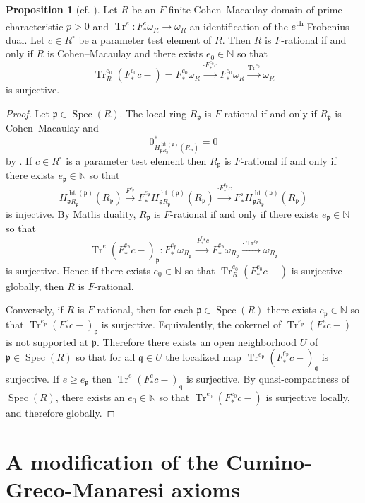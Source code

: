 \documentclass[reqno,11pt]{amsart}
\numberwithin{equation}{section}
\theoremstyle{definition}
\theoremstyle{definition}
\newtheorem{proposition}[theorem]{Proposition}
\theoremstyle{definition}
\theoremstyle{remark}
\newcommand{\Spec}{\operatorname{Spec}}
\newcommand{\ts}{\textsuperscript}
\newcommand{\Height}{\operatorname{ht}}
\newcommand{\NN}{\mathbb{N}}
\newcommand{\Tr}{\operatorname{Tr}}
\newcommand{\fp}{\mathfrak{p}}
\newcommand{\fq}{\mathfrak{q}}
\begin{document}
\begin{proposition}[{cf. \cite{Vel95}}]
     \label{prop: global Frobenius trace}
    Let $R$ be an $F$-finite Cohen--Macaulay domain of prime characteristic $p>0$ and $\Tr^e\colon F^e_*\omega_R\to \omega_R$ an identification of the $e$\ts{th} Frobenius dual. Let $c\in R^{\circ}$ be a parameter test element of $R$. Then $R$ is $F$-rational if and only if $R$ is Cohen--Macaulay and there exists $e_0\in\NN$ so that 
    \[
    \Tr^{e_0}_R(F^{e_0}_*c-) = F^{e_0}_*\omega_R\xrightarrow{\cdot F^{e_0}_*c}F^{e_0}_*\omega_R\xrightarrow{\Tr^{e_0}}\omega_R
    \]
    is surjective.
\end{proposition}

\begin{proof}
    Let $\fp\in\Spec(R)$. The local ring $R_{\fp}$ is $F$-rational if and only if $R_{\fp}$ is Cohen--Macaulay and $$0^*_{H^{\Height(\fp)}_{\fp R_{\fp}}(R_{\fp})} = 0$$ by \cite[Proposition~2.5 and Theorem~2.6]{Smi97}. If $c\in R^{\circ}$ is a parameter test element then $R_{\fp}$ is $F$-rational if and only if there exists $e_{\fp}\in \NN$ so that $$H^{\Height(\fp)}_{\fp R_{\fp}}(R_{\fp})\xrightarrow{F^{e_{\fp}}} F^{e_{\fp}}_*H^{\Height(\fp)}_{\fp R_{\fp}}(R_{\fp})\xrightarrow{\cdot F^{e_{\fp}}_*c} F^{_{\fp}}_*H^{\Height(\fp)}_{\fp R_{\fp}}(R_{\fp})$$ is injective. By Matlis duality, $R_{\fp}$ is $F$-rational if and only if there exists $e_{\fp}\in \NN$ so that 
    \[
    \Tr^e(F^{e_{\fp}}_*c-)_{\fp}\colon F^{e_{\fp}}_*\omega_{R_{\fp}}\xrightarrow{\cdot F^{e_{\fp}}_*c}F^{e_{\fp}}_*\omega_{R_{\fp}} \xrightarrow{\cdot \Tr^{e_{\fp}}}\omega_{R_{\fp}}
    \]
    is surjective. Hence if there exists $e_0\in\NN$ so that $\Tr^{e_0}_R(F^{e_{0}}_*c-)$ is surjective globally, then $R$ is $F$-rational. 
    
    Conversely, if $R$ is $F$-rational, then for each $\fp\in\Spec(R)$ there exists $e_{\fp}\in\NN$ so that $\Tr^{e_{\fp}}(F^e_*c-)_{\fp}$ is surjective. Equivalently, the cokernel of $\Tr^{e_{\fp}}(F^e_*c-)$ is not supported at $\fp$. Therefore there exists an open neighborhood $U$ of $\fp\in\Spec(R)$ so that for all $\fq\in U$ the localized map $\Tr^{e_{\fp}}(F^{e_{\fp}}_*c-)_{\fq}$ is surjective. If $e\geq e_{\fp}$ then $\Tr^e(F^e_*c-)_{\fq}$ is surjective. By quasi-compactness of $\Spec(R)$, there exists an $e_0\in \NN$ so that $\Tr^{e_0}(F^{e_0}_*c-)$ is surjective locally, and therefore globally.
\end{proof}

\section{A modification of the Cumino-Greco-Manaresi axioms}\label{sec:CGM}
\end{document}
